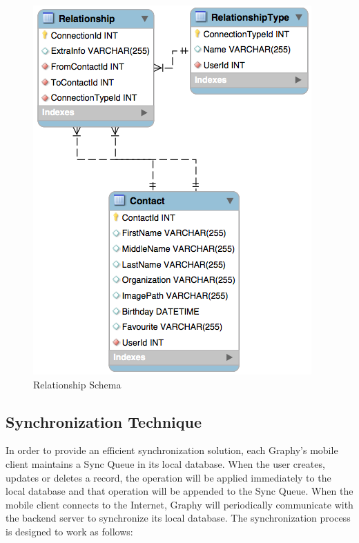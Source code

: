 \begin{figure}[!h]
\begin{centering}
\includegraphics[scale=0.65]{pics/dbrelationship}
\caption{Relationship Schema}\label{fg:dbrelationship}
\end{centering}
\end{figure}

\subsection{Synchronization Technique}
In order to provide an efficient synchronization solution, each Graphy's mobile client maintains a Sync Queue in its local database. When the user creates, updates or deletes a record, the operation will be applied immediately to the local database and that operation will be appended to the Sync Queue. When the mobile client connects to the Internet, Graphy will periodically communicate with the backend server to synchronize its local database. The synchronization process is designed to work as follows:

